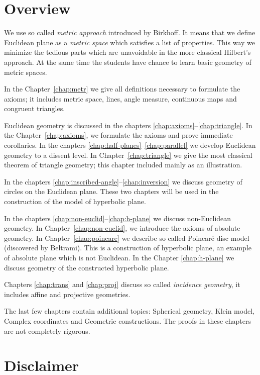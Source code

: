 \section*{Overview}

We use so called {}\emph{metric approach} introduced by Birkhoff.
It means that we define Euclidean plane as a {}\emph{metric space} which satisfies a list of properties.
This way we minimize the tedious parts
which are unavoidable in the more classical Hilbert's approach.
At the same time the students have chance to learn basic geometry of metric spaces.

In the Chapter~\ref{chap:metr} we give all definitions necessary to formulate the axioms;
it includes metric space, lines, angle measure, continuous maps and congruent triangles.

Euclidean geometry is discussed in the chapters \ref{chap:axioms}--\ref{chap:triangle}.
In the  Chapter~\ref{chap:axioms}, we formulate the axioms and prove immediate corollaries.
In the chapters \ref{chap:half-planes}--\ref{chap:parallel} 
we develop Euclidean geometry to a dissent level.
In Chapter~\ref{chap:triangle} we give the most classical theorem of triangle geometry;
this chapter included mainly as an illustration.

In the chapters \ref{chap:inscribed-angle}--\ref{chap:inversion} we discuss geometry of circles on the Euclidean plane. 
These two chapters 
will be used in the construction of the model of hyperbolic plane.

In the chapters \ref{chap:non-euclid}--\ref{chap:h-plane}
we discuss non-Euclidean geometry.
In Chapter~\ref{chap:non-euclid},
we introduce the axioms of absolute geometry.
In Chapter~\ref{chap:poincare}
we describe so called Poincar\'e disc model (discovered by Beltrami).
This is a construction of hyperbolic plane,
an example of absolute plane which is not Euclidean.
In the Chapter \ref{chap:h-plane} we discuss geometry of the constructed hyperbolic plane.

Chapters \ref{chap:trans} 
and 
\ref{chap:proj} 
discuss so called {}\emph{incidence geometry},
it includes affine and projective geometries.

The last few chapters contain additional topics:
Spherical geometry, 
Klein model,
Complex coordinates
and Geometric constructions.
The proofs in these chapters are not completely rigorous.

\section*{Disclaimer}

